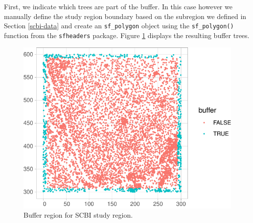 \documentclass[12pt]{article}
\newenvironment{Shaded}{\begin{snugshade}}{\end{snugshade}}
\newcommand{\DataTypeTok}[1]{\textcolor[rgb]{0.13,0.29,0.53}{#1}}
\newcommand{\DecValTok}[1]{\textcolor[rgb]{0.00,0.00,0.81}{#1}}
\newcommand{\FloatTok}[1]{\textcolor[rgb]{0.00,0.00,0.81}{#1}}
\newcommand{\KeywordTok}[1]{\textcolor[rgb]{0.13,0.29,0.53}{\textbf{#1}}}
\newcommand{\NormalTok}[1]{#1}
\newcommand{\OperatorTok}[1]{\textcolor[rgb]{0.81,0.36,0.00}{\textbf{#1}}}
\newcommand{\StringTok}[1]{\textcolor[rgb]{0.31,0.60,0.02}{#1}}
\begin{document}
First, we indicate which trees are part of the buffer. In this case
however we manually define the study region boundary based on the
subregion we defined in Section \ref{scbi-data} and create an
\texttt{sf\_polygon} object using the \texttt{sf\_polygon()} function
from the \texttt{sfheaders} package. Figure \ref{fig:scbi-define-buffer}
displays the resulting buffer trees.

\begin{Shaded}
\end{Shaded}

\begin{figure}

{\centering \includegraphics[width=0.5\linewidth]{Figures/scbi-define-buffer-1} 

}

\caption{Buffer region for SCBI study region.}\label{fig:scbi-define-buffer}
\end{figure}
\end{document}
